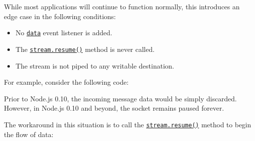 While most applications will continue to function normally, this
introduces an edge case in the following conditions:

\begin{itemize}
\tightlist
\item
  No
  \hyperref[event-data]{\texttt{\textquotesingle{}data\textquotesingle{}}}
  event listener is added.
\item
  The \hyperref[readableresume]{\texttt{stream.resume()}} method is
  never called.
\item
  The stream is not piped to any writable destination.
\end{itemize}

For example, consider the following code:

\begin{Shaded}
\begin{Highlighting}[]
\CommentTok{// }
\KeywordTok{=\textgreater{}}\NormalTok{ \{}

\NormalTok{(}\OperatorTok{,}\NormalTok{ () }\KeywordTok{=\textgreater{}}\NormalTok{ \{}
\NormalTok{(}\StringTok{\textquotesingle{}}\NormalTok{)}\OperatorTok{;}
\NormalTok{  \})}\OperatorTok{;}

\NormalTok{\})}\NormalTok{(}\NormalTok{)}\OperatorTok{;}
\end{Highlighting}
\end{Shaded}

Prior to Node.js 0.10, the incoming message data would be simply
discarded. However, in Node.js 0.10 and beyond, the socket remains
paused forever.

The workaround in this situation is to call the
\hyperref[readableresume]{\texttt{stream.resume()}} method to begin the
flow of data:

